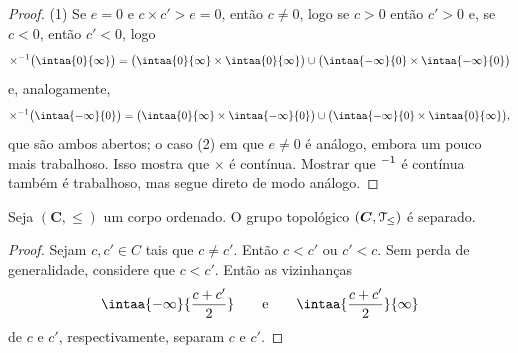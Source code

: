 \begin{proof}
(1) Se $e=0$ e $c \times c' > e=0$, então $c \neq 0$, logo se $c > 0$ então $c'>0$ e, se $c < 0$, então $c' < 0$, logo
	\begin{equation*}
	\times\inv \big( \intaa{0}{\infty} \big) = \big( \intaa{0}{\infty} \times \intaa{0}{\infty} \big) \cup \big( \intaa{-\infty}{0} \times \intaa{-\infty}{0} \big)
	\end{equation*}
e, analogamente,
	\begin{equation*}
	\times\inv \big( \intaa{-\infty}{0} \big) = \big( \intaa{0}{\infty} \times \intaa{-\infty}{0} \big) \cup \big( \intaa{-\infty}{0} \times \intaa{0}{\infty} \big),
	\end{equation*}
que são ambos abertos;
%
%
%
%
%
o caso (2) em que $e \neq 0$ é análogo, embora um pouco mais trabalhoso. Isso mostra que $\times$ é contínua. Mostrar que $^{-1}$ é contínua também é trabalhoso, mas segue direto de modo análogo.
\end{proof}







\begin{prop}
Seja $(\bm C,\leq)$ um corpo ordenado. O grupo topológico $(\bm C,\mathcal{T}_\leq)$ é separado.
\end{prop}
\begin{proof}
Sejam $c,c' \in C$ tais que $c \neq c'$. Então $c < c'$ ou $c' < c$. Sem perda de generalidade, considere que $c < c'$. Então as vizinhanças
	\begin{equation*}
	\intaa{-\infty}{\frac{c+c'}{2}} \qquad\text{e}\qquad \intaa{\frac{c+c'}{2}}{\infty}
	\end{equation*}
de $c$ e $c'$, respectivamente, separam $c$ e $c'$.
\end{proof}

